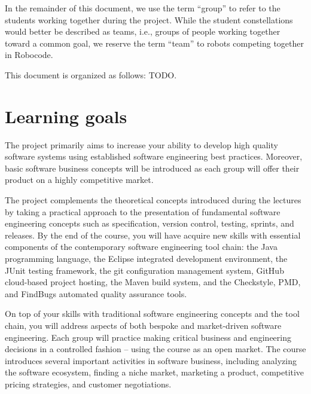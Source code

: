 \documentclass{scrreprt}
\begin{document}
In the remainder of this document, we use the term ``group'' to refer to the students working together during the project. While the student constellations would better be described as teams, i.e., groups of people working together toward a common goal, we reserve the term ``team'' to robots competing together in Robocode.

This document is organized as follows: TODO.

\section{Learning goals}
The project primarily aims to increase your ability to develop high quality software systems using established software engineering best practices. Moreover, basic software business concepts will be introduced  as each group will offer their product on a highly competitive market.

The project complements the theoretical concepts introduced during the lectures by taking a practical approach to the presentation of fundamental software engineering concepts such as specification, version control, testing, sprints, and releases. By the end of the course, you will have acquire new skills with essential components of the contemporary  software engineering tool chain: the Java programming language, the Eclipse integrated development environment, the JUnit testing framework, the git configuration management system, GitHub cloud-based project hosting, the Maven build system, and the Checkstyle, PMD, and FindBugs automated quality assurance tools.

On top of your skills with traditional software engineering concepts and the tool chain, you will address aspects of both bespoke and market-driven software engineering. Each group will practice making critical business and engineering decisions in a controlled fashion -- using the course as an open market. The course introduces several important activities in software business, including analyzing the software ecosystem, finding a niche market, marketing a product, competitive pricing strategies, and customer negotiations.
\end{document}
